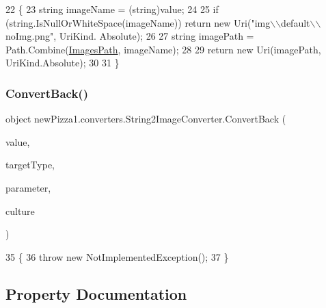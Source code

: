 \begin{DoxyCode}
22         \{
23             \textcolor{keywordtype}{string} imageName = (string)value;
24 
25             \textcolor{keywordflow}{if} (\textcolor{keywordtype}{string}.IsNullOrWhiteSpace(imageName)) \textcolor{keywordflow}{return} \textcolor{keyword}{new} Uri(\textcolor{stringliteral}{"img\(\backslash\)\(\backslash\)default\(\backslash\)\(\backslash\)noImg.png"}, UriKind.
      Absolute);
26 
27             \textcolor{keywordtype}{string} imagePath = Path.Combine(\hyperlink{classnewPizza1_1_1converters_1_1String2ImageConverter_a261c0f45c132518892027c163d88fe0a}{ImagesPath}, imageName);
28 
29             \textcolor{keywordflow}{return} \textcolor{keyword}{new} Uri(imagePath, UriKind.Absolute);
30 
31         \}
\end{DoxyCode}
\mbox{\label{classnewPizza1_1_1converters_1_1String2ImageConverter_a6807873b25db84bc4ac03253528fdc11}} 
\subsubsection{\texorpdfstring{Convert\+Back()}{ConvertBack()}}
{\footnotesize\ttfamily object new\+Pizza1.\+converters.\+String2\+Image\+Converter.\+Convert\+Back (\begin{DoxyParamCaption}\item[{object}]{value,  }\item[{Type}]{target\+Type,  }\item[{object}]{parameter,  }\item[{Culture\+Info}]{culture }\end{DoxyParamCaption})\hspace{0.3cm}{\ttfamily [inline]}}


\begin{DoxyCode}
35         \{
36             \textcolor{keywordflow}{throw} \textcolor{keyword}{new} NotImplementedException();
37         \}
\end{DoxyCode}


\subsection{Property Documentation}
\mbox{\label{classnewPizza1_1_1converters_1_1String2ImageConverter_a261c0f45c132518892027c163d88fe0a}} 
